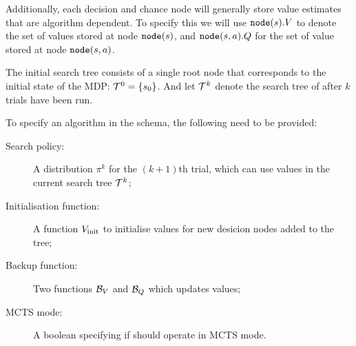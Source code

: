         Additionally, each decision and chance node will generally store value estimates that are algorithm dependent. To specify this we will use ${\textnormal{\texttt{node}}}(s).V$ to denote the set of values stored at node ${\textnormal{\texttt{node}}}(s)$, and ${\textnormal{\texttt{node}}}(s,a).Q$ for the set of value stored at node ${\textnormal{\texttt{node}}}(s,a)$. 


        The initial search tree consists of a single root node that corresponds to the initial state of the MDP: $\mathcal{T}^0=\{s_0\}$. And let $\mathcal{T}^k$ denote the search tree of \thtspp\ewe after $k$ trials have been run.

        To specify an algorithm in the \thtspp\ewe schema, the following need to be provided:
        \begin{description}
            \item[Search policy:]
                A distribution  $\pi^{k}$ for the $(k+1)$th trial, which can use values in the current search tree $\mathcal{T}^{k}$;
            \item[Initialisation function:]
                A function $V_{\text{init}}$ to initialise values for new desicion nodes added to the tree;
            \item[Backup function:]
                Two functions $\mathcal{B}_V$ and $\mathcal{B}_Q$ which updates values; 
            \item[MCTS mode:]
                A boolean \mctsmode specifying if \thtspp\ewe should operate in MCTS mode.
        \end{description}


